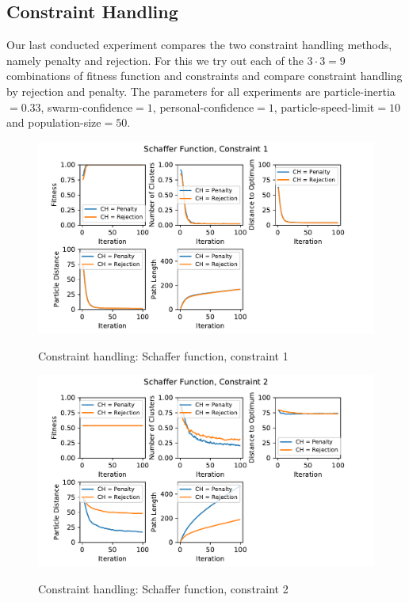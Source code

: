 \documentclass[12pt]{article}
\begin{document}
\subsection{Constraint Handling}
Our last conducted experiment compares the two constraint handling methods, namely penalty and rejection.
For this we try out each of the $3\cdot 3=9$ combinations of fitness function and constraints and compare constraint handling by rejection and penalty.
The parameters for all experiments are particle-inertia$=0.33$, swarm-confidence$=1$, personal-confidence$=1$, particle-speed-limit$=10$ and population-size$=50$.

\begin{figure}
	\centering
	\includegraphics[width=1\textwidth]{figures/ex6/ex6-1-Constraint_1.pdf}
	\label{fig:ex6-1-1}
	\caption{Constraint handling: Schaffer function, constraint 1}
\end{figure}
\begin{figure}
	\centering
	\includegraphics[width=1\textwidth]{figures/ex6/ex6-1-Constraint_2.pdf}
	\label{fig:ex6-1-1}
	\caption{Constraint handling: Schaffer function, constraint 2}
\end{figure}
\end{document}
